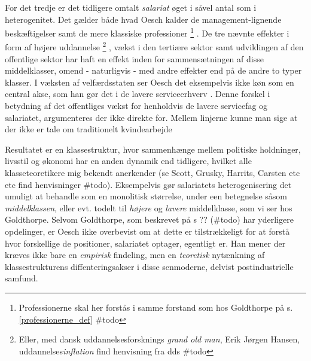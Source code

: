 For det tredje er det tidligere omtalt \emph{salariat} øget i såvel antal som i heterogenitet. Det gælder både hvad Oesch kalder de management-lignende beskæftigelser samt de mere klassiske professioner%
%
\footnote{Professionerne skal her forstås i samme forstand som hos Goldthorpe på s. \ref{professionerne_def} \#todo}%
%
. De tre nævnte effekter i form af højere uddannelse%
%
\footnote{Eller,  med dansk uddannelsesforsknings \emph{grand old man}, Erik Jørgen Hansen, uddannelses\emph{inflation} find henvisning fra dds \#todo}%
%
, vækst i den tertiære sektor samt udviklingen af den offentlige sektor har haft en effekt inden for sammensætningen af disse middelklasser, omend - naturligvis - med andre effekter end på de andre to typer klasser. I væksten af velfærdsstaten ser Oesch det eksempelvis ikke køn som en central akse, som han gør det i de lavere serviceerhverv \parencite[2f]{Oesch2006a}. 
Denne forskel i betydning af det offentliges vækst for henholdvis de lavere servicefag og salariatet, argumenteres der ikke direkte for. Mellem linjerne kunne man sige at der ikke er tale om traditionelt kvindearbejde 

Resultatet er en klassestruktur, hvor sammenhænge mellem politiske holdninger, livsstil og økonomi har en anden dynamik end tidligere, hvilket alle klasseteoretikere mig bekendt anerkender (se Scott, Grusky, Harrits, Carsten etc etc find henvisninger \#todo). Eksempelvis gør salariatets heterogenisering det umuligt at behandle som en monolitisk størrelse, under een betegnelse såsom \emph{middelklassen}, eller evt. todelt til \emph{højere} og \emph{lavere} middelklasse, som vi ser hos Goldthorpe. Selvom Goldthorpe, som beskrevet på s ?? (\#todo) har yderligere opdelinger, er Oesch ikke overbevist om at dette er tilstrækkeligt for at forstå hvor forskellige de positioner, salariatet optager, egentligt er. Han mener der kræves ikke bare en \emph{empirisk} findeling, men en \emph{teoretisk} nytænkning af klassestrukturens diffenteringsakser i disse senmoderne, delvist postindustrielle samfund. 










